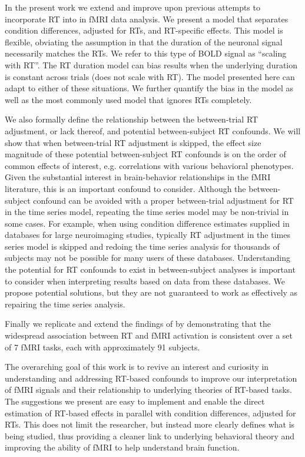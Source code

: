 \documentclass[titlepage,12pt] {article}
\begin{document}
In the present work we extend and improve upon previous attempts to incorporate RT into in fMRI data analysis.   We present a model that separates condition differences, adjusted for RTs, and RT-specific effects.  This model is flexible, obviating the assumption in \citet{grinband_detection_2008} that the duration of the neuronal signal necessarily matches the RTs.  We refer to this type of BOLD signal as ``scaling with RT''.  The RT duration model can bias results when the underlying duration is constant across trials (does not scale with RT).  The model presented here can adapt to either of these situations.  We further quantify the bias in the \citet{grinband_detection_2008} model as well as the most commonly used model that ignores RTs completely.  

We also formally define the relationship between the between-trial RT adjustment, or lack thereof, and potential between-subject RT confounds.  We will show that when between-trial RT adjustment is skipped, the effect size magnitude of these potential between-subject RT confounds is on the order of common effects of interest,  e.g. correlations with various behavioral phenotypes.  Given the substantial interest in brain-behavior relationships in the fMRI literature, this is an important confound to consider.   Although the between-subject confound can be avoided with a proper between-trial adjustment for RT in the time series model, repeating the time series model may be non-trivial in some cases.  For example, when using condition difference estimates supplied in databases for large neuroimaging studies, typically RT adjustment in the times series model is skipped and redoing the time series analysis for thousands of subjects may not be possible for many users of these databases.  Understanding the potential for RT confounds to exist in between-subject analyses is important to consider when interpreting results based on data from these databases.  We propose potential solutions, but they are not guaranteed to work as effectively as repairing the time series analysis.

Finally we replicate and extend the findings of \citet{yarkoni_bold_2009} by demonstrating that the widespread association between RT and fMRI activation is consistent over a set of 7 fMRI tasks, each with approximately 91 subjects.  

The overarching goal of this work is to revive an interest and curiosity in understanding and addressing RT-based confounds to improve our interpretation of fMRI signals and their relationship to underlying theories of RT-based tasks. The suggestions we present are easy to implement and enable the direct estimation of RT-based effects in parallel with condition differences, adjusted for RTs.  This does not limit the researcher, but instead more clearly defines what is being studied, thus providing a cleaner link to underlying behavioral theory and improving the ability of fMRI to help understand brain function.
\end{document}
